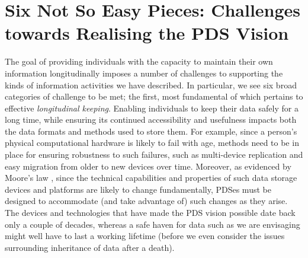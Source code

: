 \documentclass{acm_proc_article-sp}
\begin{document}

\section{Six Not So Easy Pieces: Challenges towards Realising the PDS Vision}


The goal of providing individuals with the capacity to maintain their own information longitudinally imposes a number of challenges to supporting the kinds of information activities we have described.  In particular, we see six broad categories of challenge to be met; the first, most fundamental of which pertains to effective \emph{longitudinal keeping}.  Enabling individuals to keep their data safely for a long time, while ensuring its continued accessibility and usefulness impacts both the data formats and methods used to store them.  For example, since a person's physical computational hardware is likely to fail with age, methods need to be in place for ensuring robustness to such failures, such as multi-device replication and easy migration from older to new devices over time.   Moreover, as evidenced by Moore's law \cite{schaller1997moore}, since the technical capabilities and properties of such data storage devices and platforms are likely to change fundamentally, PDSes must be designed to accommodate (and take advantage of) such changes as they arise. The devices and technologies that have made the PDS vision possible date back only a couple of decades, whereas a safe haven for data such as we are envisaging might well have to last a working lifetime (before we even consider the issues surrounding inheritance of data after a death).
\end{document}
